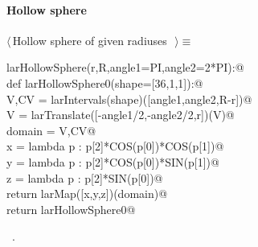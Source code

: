 \documentclass[11pt,oneside]{article}	%
\begin{document}
\paragraph{Hollow sphere}
\begin{flushleft} \small \label{scrap20}
$\langle\,$Hollow sphere of given radiuses\nobreak\ {\footnotesize {}}$\,\rangle\equiv$
\vspace{-1ex}
\begin{list}{}{} \item
\mbox{}\verb@def larHollowSphere(r,R,angle1=PI,angle2=2*PI):@\\
\mbox{}\verb@   def larHollowSphere0(shape=[36,1,1]):@\\
\mbox{}\verb@      V,CV = larIntervals(shape)([angle1,angle2,R-r])@\\
\mbox{}\verb@      V = larTranslate([-angle1/2,-angle2/2,r])(V)@\\
\mbox{}\verb@      domain = V,CV@\\
\mbox{}\verb@      x = lambda p : p[2]*COS(p[0])*COS(p[1])@\\
\mbox{}\verb@      y = lambda p : p[2]*COS(p[0])*SIN(p[1])@\\
\mbox{}\verb@      z = lambda p : p[2]*SIN(p[0])@\\
\mbox{}\verb@      return larMap([x,y,z])(domain)@\\
\mbox{}\verb@   return larHollowSphere0@\\
\mbox{}\verb@@{\NWsep}
\end{list}
\vspace{-1ex}
\footnotesize\addtolength{\baselineskip}{-1ex}
\begin{list}{}{\setlength{\itemsep}{-\parsep}\setlength{\itemindent}{-\leftmargin}}
\item \NWtxtMacroRefIn\ .
\end{list}
\end{flushleft}
\end{document}
